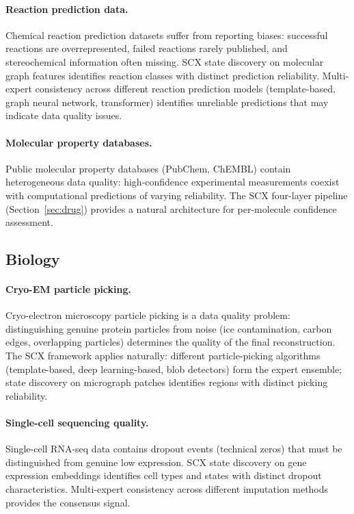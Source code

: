 \documentclass[twocolumn]{article}
\theoremstyle{definition}
\begin{document}
\paragraph{Reaction prediction data.}
Chemical reaction prediction datasets suffer from reporting biases: successful reactions are overrepresented, failed reactions rarely published, and stereochemical information often missing. SCX state discovery on molecular graph features identifies reaction classes with distinct prediction reliability. Multi-expert consistency across different reaction prediction models (template-based, graph neural network, transformer) identifies unreliable predictions that may indicate data quality issues.

\paragraph{Molecular property databases.}
Public molecular property databases (PubChem, ChEMBL) contain heterogeneous data quality: high-confidence experimental measurements coexist with computational predictions of varying reliability. The SCX four-layer pipeline (Section~\ref{sec:drug}) provides a natural architecture for per-molecule confidence assessment.

\subsection{Biology}

\paragraph{Cryo-EM particle picking.}
Cryo-electron microscopy particle picking is a data quality problem: distinguishing genuine protein particles from noise (ice contamination, carbon edges, overlapping particles) determines the quality of the final reconstruction. The SCX framework applies naturally: different particle-picking algorithms (template-based, deep learning-based, blob detectors) form the expert ensemble; state discovery on micrograph patches identifies regions with distinct picking reliability.

\paragraph{Single-cell sequencing quality.}
Single-cell RNA-seq data contains dropout events (technical zeros) that must be distinguished from genuine low expression. SCX state discovery on gene expression embeddings identifies cell types and states with distinct dropout characteristics. Multi-expert consistency across different imputation methods provides the consensus signal.
\end{document}
